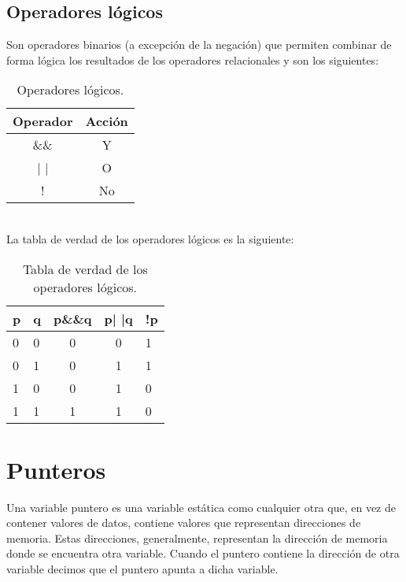 \subsection{Operadores lógicos}{
Son operadores binarios (a excepción de la negación) que permiten combinar de forma lógica los resultados de los operadores relacionales y son los siguientes:\\
\begin{table}[htbp]
	\begin{center}
		\begin{tabular}{|c|c|}
			\hline
			\textbf{Operador} & \textbf{Acción}  \\
			\hline 
			\&\&  & Y\\ \hline
			| |  & O\\ \hline
			!  & No\\ \hline	
		\end{tabular}
		\caption{Operadores lógicos.}
		\label{tabla:Operadores lógicos}
	\end{center}
\end{table}\\
La tabla de verdad de los operadores lógicos es la siguiente:
\begin{table}[htbp]
	\begin{center}
		\begin{tabular}{|l|l|c|c|l|}
			\hline
			\textbf{p} & \textbf{q} & \textbf{p\&\&q} & \textbf{p| |q} & \textbf{!p}  \\
			\hline 
			0 & 0 & 0 & 0 & 1\\ \hline
			0 & 1 & 0 & 1 & 1\\ \hline
			1 & 0 & 0 & 1 & 0\\ \hline
			1 & 1 & 1 & 1 & 0\\ \hline	
		\end{tabular}
		\caption{Tabla de verdad de los operadores lógicos.}
		\label{tabla:Tabla de verdad de los operadores lógicos}
	\end{center}
\end{table}
}
\section{Punteros}
Una variable puntero es una variable estática como cualquier otra que, en vez de contener valores de datos, contiene valores que representan direcciones de memoria. Estas direcciones, generalmente, representan la dirección de memoria donde se encuentra otra variable. Cuando el puntero contiene la dirección de otra variable decimos que el puntero apunta a dicha variable.

